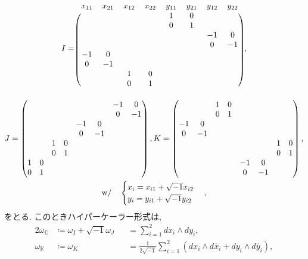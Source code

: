 \documentclass{ltjsarticle}
\theoremstyle{definition}
\begin{document}
\begin{gather}
I=
  \begin{blockarray}{cccccccc}
  x_{11}&x_{21}&x_{12}&x_{22}&y_{11}&y_{21}&y_{12}&y_{22}\\
  \begin{block}{(cccccccc)}
  &&&&1&0&&\\
  &&&&0&1&&\\
  &&&&&&-1&0\\
  &&&&&&0&-1\\
  -1&0&&&&&&\\
  0&-1&&&&&&\\
  &&1&0&&&&\\
  &&0&1&&&&\\
  \end{block}
  \end{blockarray}\,,\\
  J=
  \begin{pmatrix}
    &&&&&&-1&0\\
    &&&&&&0&-1\\
    &&&&-1&0&&\\
    &&&&0&-1&&\\
    &&1&0&&&&\\
    &&0&1&&&&\\
    1&0&&&&&&\\
    0&1&&&&&&
  \end{pmatrix},
  K=
  \begin{pmatrix}
    &&1&0&&&&\\
    &&0&1&&&&\\
    -1&0&&&&&&\\
    0&-1&&&&&&\\
    &&&&&&1&0\\
    &&&&&&0&1\\
    &&&&-1&0&&\\
    &&&&0&-1&&
  \end{pmatrix},\\
  \mathrm{w/}\quad
  \begin{cases}
    x_i=x_{i1}+\sqrt{-1}x_{i2}\\
    y_i=y_{i1}+\sqrt{-1}y_{i2}
  \end{cases},
\end{gather}
をとる. このときハイパーケーラー形式は,
\begin{alignat}{2}
  \omega_\mathbb C&\coloneqq\omega_I+\sqrt{-1}\omega_J&&=\sum_{i=1}^2dx_i\wedge dy_i,\\
  \omega_\mathbb R&\coloneqq\omega_K&&=\frac1{2\sqrt{-1}}\sum_{i=1}^2\left(dx_i\wedge d\bar x_i+dy_i\wedge d\bar y_i\right),
\end{alignat}
\end{document}
